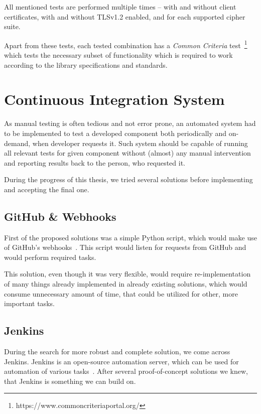     All mentioned tests are performed multiple times -- with and without
    client certificates, with and without TLSv1.2 enabled, and for each
    supported cipher suite.

    Apart from these tests, each tested combination has a \textit{Common Criteria}
    test~\footnote{https://www.commoncriteriaportal.org/} which tests
    the necessary subset of functionality which is required to work according
    to the library specifications and standards.

\section{Continuous Integration System}
    As manual testing is often tedious and not error prone, an automated system
    had to be implemented to test a developed component both periodically and
    on-demand, when developer requests it. Such system should be capable of
    running all relevant tests for given component without (almost) any manual
    intervention and reporting results back to the person, who requested
    it.~\cite{amazon-ci}

    During the progress of this thesis, we tried several solutions before
    implementing and accepting the final one.

\subsection{GitHub \& Webhooks}
    First of the proposed solutions was a simple Python script, which would
    make use of GitHub's webhooks~\cite{github-webhooks}. This script would listen
    for requests from GitHub and would perform required tasks.

    This solution, even though it was very flexible, would require re-implementation
    of many things already implemented in already existing solutions, which would
    consume unnecessary amount of time, that could be utilized for other, more important tasks.

\subsection{Jenkins}
    During the search for more robust and complete solution, we come across
    Jenkins. Jenkins is an open-source automation server, which can be used
    for automation of various tasks~\cite{jenkins-docs}. After several
    proof-of-concept solutions we knew, that Jenkins is something we can
    build on.

